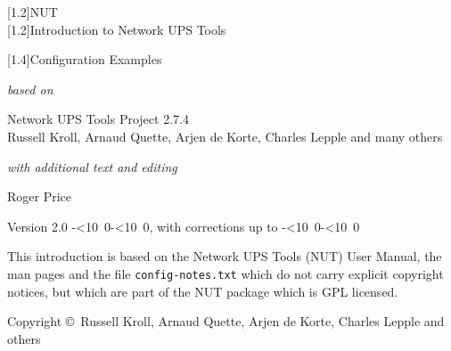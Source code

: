 \documentclass[12pt]{article}
\def\isodate{\leavevmode\hbox{\the\year-\twodigits\month-\twodigits\day}}
\def\twodigits#1{\ifnum#1<10 0\fi\the#1}
\newcommand{\Version}{2.0 \isodate}
\renewcommand{\thepage}{}            %
\begin{document}
\begin{center}
\scalebox{1.0}[1.2]{\textsf{\Huge{NUT}}} \\[6mm]
\scalebox{1.0}[1.2]{\textsf{\Huge{Introduction to Network UPS Tools}}} \\

\vspace*{\fill}

\scalebox{1.2}[1.4]{\textsf{\Huge{Configuration Examples}}} \\

\vspace*{\fill}

\textsl{based on}
\vspace{4mm}

\textsf{\Large{Network UPS Tools Project 2.7.4}} \\
\textsf{\normalsize Russell Kroll},
\textsf{\normalsize Arnaud Quette},
\textsf{\normalsize Arjen de Korte},
\textsf{\normalsize Charles Lepple and many others}
\vspace*{\fill}

\textsl{with additional text and editing}
\vspace{4mm}

\textsf{\normalsize Roger Price}

\vspace*{\fill}

\textsf{Version \Version, with corrections up to \isodate} \\
\end{center}

\vspace*{\fill}

\renewcommand{\thepage}{\roman{page}}

This introduction is based on the Network UPS Tools (NUT) User Manual, the man
pages and the file \texttt{config-notes.txt} which do not carry explicit
copyright notices, but which are part of the NUT package which is GPL
licensed.

\vspace{5mm}

\textsf{Copyright \copyright\ Russell Kroll, Arnaud Quette, Arjen de Korte,
  Charles Lepple and others}

\vspace{5mm}
\end{document}
